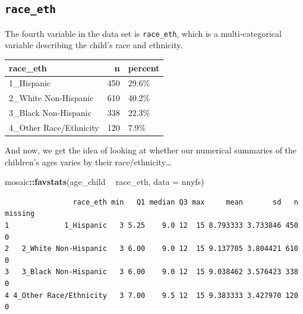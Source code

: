 \documentclass[
]{book}
\newenvironment{Shaded}{\begin{snugshade}}{\end{snugshade}}
\newcommand{\DataTypeTok}[1]{\textcolor[rgb]{0.13,0.29,0.53}{#1}}
\newcommand{\KeywordTok}[1]{\textcolor[rgb]{0.13,0.29,0.53}{\textbf{#1}}}
\newcommand{\NormalTok}[1]{#1}
\newcommand{\OperatorTok}[1]{\textcolor[rgb]{0.81,0.36,0.00}{\textbf{#1}}}
\newcommand{\StringTok}[1]{\textcolor[rgb]{0.31,0.60,0.02}{#1}}
\begin{document}
\hypertarget{race_eth}{%
\subsection{\texorpdfstring{\texttt{race\_eth}}{race\_eth}}\label{race_eth}}

The fourth variable in the data set is \texttt{race\_eth}, which is a multi-categorical variable describing the child's race and ethnicity.

\begin{Shaded}
\end{Shaded}

\begin{tabular}{l|r|l}
\hline
race\_eth & n & percent\\
\hline
1\_Hispanic & 450 & 29.6\%\\
\hline
2\_White Non-Hispanic & 610 & 40.2\%\\
\hline
3\_Black Non-Hispanic & 338 & 22.3\%\\
\hline
4\_Other Race/Ethnicity & 120 & 7.9\%\\
\hline
\end{tabular}

And now, we get the idea of looking at whether our numerical summaries of the children's ages varies by their race/ethnicity\ldots{}

\begin{Shaded}
\begin{Highlighting}[]
\NormalTok{mosaic}\OperatorTok{::}\KeywordTok{favstats}\NormalTok{(age_child }\OperatorTok{~}\StringTok{ }\NormalTok{race_eth, }\DataTypeTok{data =}\NormalTok{ nnyfs)}
\end{Highlighting}
\end{Shaded}

\begin{verbatim}
                race_eth min   Q1 median Q3 max     mean       sd   n missing
1             1_Hispanic   3 5.25    9.0 12  15 8.793333 3.733846 450       0
2   2_White Non-Hispanic   3 6.00    9.0 12  15 9.137705 3.804421 610       0
3   3_Black Non-Hispanic   3 6.00    9.0 12  15 9.038462 3.576423 338       0
4 4_Other Race/Ethnicity   3 7.00    9.5 12  15 9.383333 3.427970 120       0
\end{verbatim}
\end{document}
